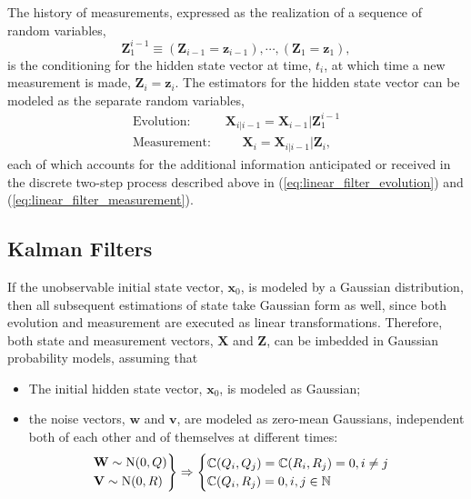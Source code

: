 \documentclass[12pt, twoside, draft]{article}
\begin{document}
The history of measurements, expressed as the realization of a sequence of random variables,
\begin{equation}
\mathbf{Z}_1^{i-1} \equiv (\mathbf{Z}_{i-1} = \mathbf{z}_{i-1}), \cdots, (\mathbf{Z}_1 = \mathbf{z}_1), 
\end{equation}
is the conditioning for the hidden state vector at time, $t_i$, at which time a new measurement is made, $\mathbf{Z}_i = \mathbf{z}_i$.  The estimators for the hidden state vector can be modeled as the separate random variables,
\begin{align}
\text{Evolution: } & \mathbf{X}_{i|i-1} = \mathbf{X}_{i-1} | \mathbf{Z}_1^{i-1} \\
\text{Measurement: } & \hspace{16pt} \mathbf{X}_i = \mathbf{X}_{i|i-1} | \mathbf{Z}_i,
\end{align}
each of which accounts for the additional information anticipated or received in the discrete two-step process described above in (\ref{eq:linear_filter_evolution}) and (\ref{eq:linear_filter_measurement}).

\subsection{Kalman Filters}\label{sec:Kalman_filter}
If the unobservable initial state vector, $\mathbf{x}_0$, is modeled by a Gaussian distribution, then all subsequent estimations of state take Gaussian form as well, since both evolution and measurement are executed as linear transformations.  Therefore, both state and measurement vectors, $\mathbf{X}$ and $\mathbf{Z}$, can be imbedded in Gaussian probability models, assuming that
\begin{itemize}[noitemsep]
\item The initial hidden state vector, $\mathbf{x}_0$, is modeled as Gaussian; \\
\item the noise vectors, $\mathbf{w}$ and $\mathbf{v}$, are modeled as zero-mean Gaussians, independent both of each other and of themselves at different times:
\begin{equation}
\begin{rcases}
\mathbf{W} \sim \operatorname{N}(0, Q) \\
\mathbf{V} \sim \operatorname{N}(0, R)
\end{rcases} \Rightarrow
\begin{cases}
\mathbb{C}(Q_i, Q_j) = \mathbb{C}(R_i,R_j) = 0, i \neq j \\
\mathbb{C}(Q_i, R_j) = 0, i, j \in \mathbb{N}
\end{cases}
\end{equation}
\end{itemize}
\end{document}
